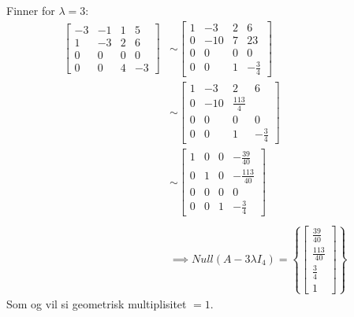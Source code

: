 \documentclass[11pt, a4paper, norsk]{NTNUoving}
\begin{document}
\begin{oppgave}
\begin{punkt}
            Finner for $\lambda = 3$:
            \begin{align*}
                \begin{bmatrix}
                    -3 & -1 & 1 & 5 \\
                    1 & -3 & 2 & 6 \\
                    0 & 0 & 0 & 0 \\
                    0 & 0 & 4 & -3
                \end{bmatrix} &\sim \begin{bmatrix}
                1 & -3 & 2 & 6 \\
                0 & -10 & 7 & 23 \\
                0 & 0 & 0 & 0 \\
                0 & 0 & 1 & -\frac{3}{4}
                \end{bmatrix}
                \\
                &\sim \begin{bmatrix}
                    1 & -3 & 2 & 6 \\
                    0 & -10 & \frac{113}{4} \\
                    0 & 0 & 0 & 0 \\
                    0 & 0 & 1 & -\frac{3}{4}
                \end{bmatrix}
                \\
                &\sim \begin{bmatrix}
                    1 & 0 & 0 & -\frac{39}{40} \\
                    0 & 1 & 0 & -\frac{113}{40} \\
                    0 & 0 & 0 & 0 \\
                    0 & 0 & 1 & -\frac{3}{4}
                \end{bmatrix}
                \\
                \\
                &\implies Null(A - 3\lambda I_4) = \left\{\begin{bmatrix}
                    \frac{39}{40} \\
                    \frac{113}{40} \\
                    \frac{3}{4} \\
                    1
                \end{bmatrix}\right\}
            \end{align*}
            Som og vil si geometrisk multiplisitet $=1$.


\end{punkt}
\end{oppgave}
\end{document}
